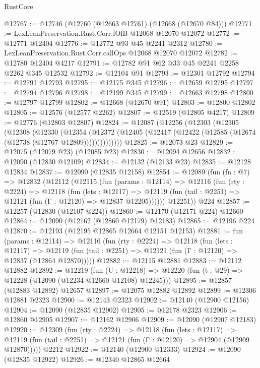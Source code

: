 \begin{lexlean}{RustCore}
\begin{coremodule}
@12767 := @12746 (@12760 (@12663 @12761) (@12668 (@12670 @84)))
@12771 := LexLeanPreservation.Rust.Corr.fOfB @12068 @12070 @12072
@12772 := @12771 @12404
@12776 := @12772 @93 @45 @2241 @2312
@12780 := LexLeanPreservation.Rust.Corr.callOps @12068 @12070 @12072
@12782 := @12780 @12404 @4217
@12791 := @12782 @91 @62 @33 @45 @2241 @2258 @2262 @345 @12532
@12792 := @12104 @91
@12793 := @12301 @12792
@12794 := @12791 @12793
@12795 := @12175 @345
@12796 := @12659 @12795
@12797 := @12794 @12796
@12798 := @12199 @345
@12799 := @12663 @12798
@12800 := @12797 @12799
@12802 := @12668 (@12670 @91)
@12803 := @12800 @12802
@12805 := @12576 (@12577 @2262)
@12807 := @12519 (@12805 @4217)
@12809 := @12776 (@12803 @12807)
@12824 := @12087
    (@12256
      (@12303
        (@12305
          (@12308
            (@12330
              (@12354
                (@12372 (@12405 (@12417 (@12422 (@12585 (@12674 (@12738 (@12767 @12809))))))))))))))
@12825 := @12073 @23
@12829 := @12075 (@12079 @23) (@12085 @23)
@12830 := @12094 @12656
@12832 := @12090 (@12830 @12109)
@12834 := @12132 (@12133 @23)
@12835 := @12128 @12834
@12837 := @12090 (@12835 @12158)
@12854 := @12089
    (fun (fn : @7) =>
    @12832
      (@12112
        (@12115
          (fun (params : @12114) =>
          @12116
            (fun (rty : @2224) =>
            @12118
              (fun (lets : @12117) =>
              @12119 (fun (tail : @2251) => @12121 (fun (Γ : @12120) => @12837 @12205))))))
        @12251))
    @224
@12857 := @12257 (@12830 (@12107 @224))
@12860 := @12170 (@12171 @224) @12660
@12864 := @12090 (@12162 (@12860 @12179) @12183)
@12865 := @12196 @224
@12870 := @12193 (@12195 @12865 @12664 @12151 @12153)
@12881 := fun (params : @12114) =>
  @12116
    (fun (rty : @2224) =>
    @12118
      (fun (lets : @12117) =>
      @12119 (fun (tail : @2251) => @12121 (fun (Γ : @12120) => @12837 (@12864 @12870)))))
@12882 := @12115 @12881
@12883 := @12112 @12882
@12892 := @12219
    (fun (U : @12218) => @12220 (fun (t : @29) => @12228 (@12090 (@12234 @12660 @12108) @12245)))
@12895 := @12857 (@12883 @12892) @12657
@12897 := @12075 @12882 @12892
@12899 := @12306 @12881 @2323
@12900 := @12143 @2323
@12902 := @12140 (@12900 @12156)
@12904 := @12090 (@12835 @12902)
@12905 := @12178 @2323
@12906 := @12860 @12905
@12907 := @12162 @12906
@12909 := @12090 (@12907 @12183)
@12920 := @12309
    (fun (rty : @2224) =>
    @12118
      (fun (lets : @12117) =>
      @12119 (fun (tail : @2251) => @12121 (fun (Γ : @12120) => @12904 (@12909 @12870)))))
    @2212
@12922 := @12140 (@12900 @12333)
@12924 := @12090 (@12835 @12922)
@12926 := @12340 @12865 @12664

\end{coremodule}
\end{lexlean}
